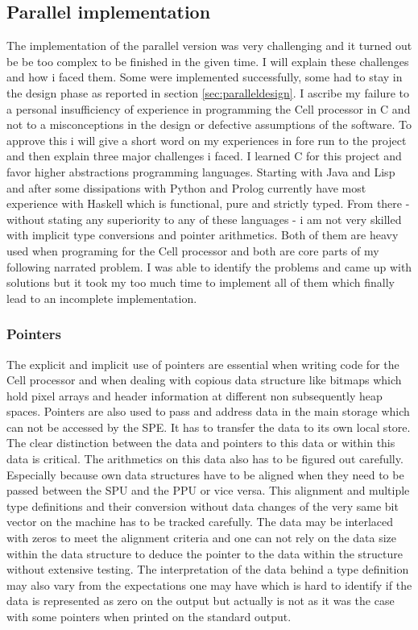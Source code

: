 \subsection{Parallel implementation}
\label{sec:par_imp}
The implementation of the parallel version was very challenging and it turned out be be too complex to be finished in the given time. I will explain these challenges and how i faced them. Some were implemented successfully, some had to stay in the design phase as reported in section \ref{sec:paralleldesign}. I ascribe my failure to a personal insufficiency of experience in programming the Cell processor in C and not to a misconceptions in the design or defective assumptions of the software. To approve this i will give a short word on my experiences in fore run to the project and then explain three major challenges i faced.
I learned C for this project and favor higher abstractions programming languages. Starting with Java and Lisp  and after some dissipations with Python and Prolog currently have most experience with Haskell which is functional, pure and strictly typed. From there - without stating any superiority to any of these languages - i am not very skilled with implicit type conversions and pointer arithmetics. Both of them are heavy used when programing for the Cell processor and both are core parts of my following narrated problem. I was able to identify the problems and came up with solutions but it took my too much time to implement all of them which finally lead to an incomplete implementation.

\subsubsection{Pointers}
The explicit and implicit use of pointers are essential when writing code for the Cell processor and when dealing with copious data structure like bitmaps which hold pixel arrays and header information at different non subsequently heap spaces. Pointers are also used to pass and address data in the main storage which can not be accessed by the SPE. It has to transfer the data to its own local store. The clear distinction between the data and pointers to this data or within this data is critical. The arithmetics on this data also has to be figured out carefully. Especially because own data structures have to be aligned when they need to be passed between the SPU and the PPU or vice versa. This alignment and multiple type definitions and their conversion without data changes of the very same bit vector on the machine has to be tracked carefully. The data may be interlaced with zeros to meet the alignment criteria and one can not rely on the data size within the data structure to deduce the pointer to the data within the structure without extensive testing.
The interpretation of the data behind a type definition may also vary from the expectations one may have which is hard to identify if the data is represented as zero on the output but actually is not as it was the case with some pointers when printed on the standard output.

